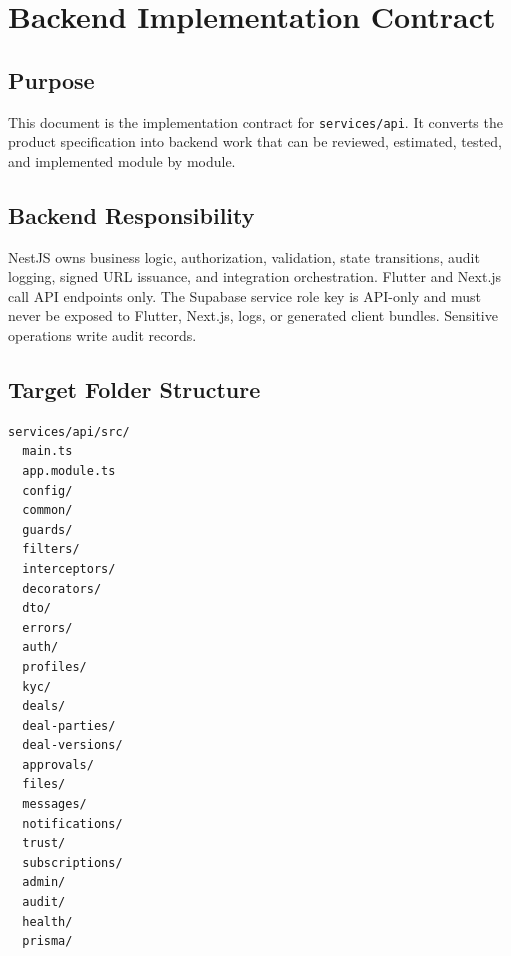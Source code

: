 \chapter*{Backend Implementation Contract}

\section*{Purpose}
This document is the implementation contract for \texttt{services/api}. It converts the product specification into backend work that can be reviewed, estimated, tested, and implemented module by module.

\section*{Backend Responsibility}
NestJS owns business logic, authorization, validation, state transitions, audit logging, signed URL issuance, and integration orchestration. Flutter and Next.js call API endpoints only. The Supabase service role key is API-only and must never be exposed to Flutter, Next.js, logs, or generated client bundles. Sensitive operations write audit records.

\section*{Target Folder Structure}
\begin{verbatim}
services/api/src/
  main.ts
  app.module.ts
  config/
  common/
  guards/
  filters/
  interceptors/
  decorators/
  dto/
  errors/
  auth/
  profiles/
  kyc/
  deals/
  deal-parties/
  deal-versions/
  approvals/
  files/
  messages/
  notifications/
  trust/
  subscriptions/
  admin/
  audit/
  health/
  prisma/
\end{verbatim}

